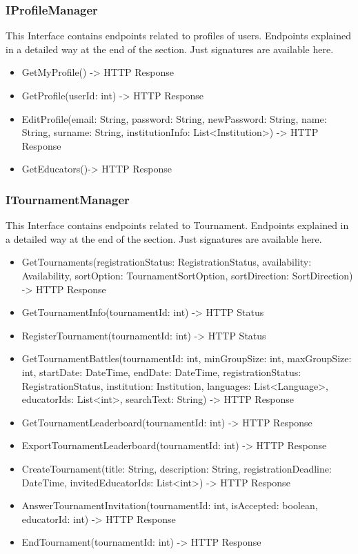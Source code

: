 \subsubsection{IProfileManager}
This Interface contains endpoints related to profiles of users. Endpoints explained in a detailed way at the end of the section. Just signatures are available here.
\begin{itemize}
\item GetMyProfile() -> HTTP Response
\item GetProfile(userId: int) -> HTTP Response
\item EditProfile(email: String, password: String, newPassword: String, name: String, surname: String, institutionInfo: List<Institution>) -> HTTP Response
\item GetEducators()-> HTTP Response
\end{itemize}
\subsubsection{ITournamentManager}
This Interface contains endpoints related to Tournament. Endpoints explained in a detailed way at the end of the section. Just signatures are available here.
\begin{itemize}
\item GetTournaments(registrationStatus: RegistrationStatus, availability: Availability, sortOption: TournamentSortOption, sortDirection: SortDirection) -> HTTP Response
\item GetTournamentInfo(tournamentId: int) -> HTTP Status
\item RegisterTournament(tournamentId: int) -> HTTP Status
\item GetTournamentBattles(tournamentId: int, minGroupSize: int, maxGroupSize: int, startDate: DateTime, endDate: DateTime, registrationStatus: RegistrationStatus, institution: Institution, languages: List<Language>, educatorIds: List<int>, searchText: String) -> HTTP Response
\item GetTournamentLeaderboard(tournamentId: int) -> HTTP Response
\item ExportTournamentLeaderboard(tournamentId: int) -> HTTP Response
\item CreateTournament(title: String, description: String, registrationDeadline: DateTime, invitedEducatorIds: List<int>) -> HTTP Response
\item AnswerTournamentInvitation(tournamentId: int, isAccepted: boolean, educatorId: int) -> HTTP Response
\item EndTournament(tournamentId: int) -> HTTP Response
\end{itemize}

